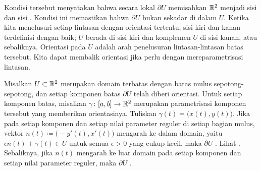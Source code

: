 Kondisi tersebut menyatakan bahwa secara lokal $\partial U$ memisahkan ${\mathbb{R}}^2$
menjadi sisi  dan sisi .  Kondisi ini memastikan
bahwa $\partial U$ bukan sekadar  di dalam $U$.
Ketika kita menelusuri setiap lintasan dengan
orientasi tertentu, sisi kiri dan kanan terdefinisi dengan baik; $U$ berada di
sisi kiri dan komplemen $U$ di sisi kanan, atau sebaliknya.
Orientasi pada $U$ adalah arah penelusuran lintasan-lintasan batas tersebut.
Kita dapat membalik orientasi jika perlu dengan mereparametrisasi lintasan.

\begin{defn}
Misalkan $U \subset {\mathbb{R}}^2$ merupakan domain terbatas dengan batas mulus
sepotong-sepotong, dan setiap komponen batas $\partial U$ telah diberi orientasi.
Untuk setiap komponen batas, misalkan $\gamma \colon [a,b] \to {\mathbb{R}}^2$
merupakan parametrisasi komponen tersebut yang memberikan orientasinya.
Tuliskan $\gamma(t) = \big(x(t),y(t)\bigr)$.  Jika pada setiap komponen dan
setiap nilai parameter reguler di setiap bagian mulus, vektor
$n(t) \coloneqq \bigl(-y'(t),x'(t)\bigr)$ mengarah ke dalam domain,
yaitu $\epsilon n(t) + \gamma(t) \in U$ untuk semua $\epsilon > 0$ yang cukup
kecil, maka $\partial U$ \emph{}.
Lihat .
Sebaliknya, jika $n(t)$ mengarah ke luar domain pada setiap komponen dan setiap
nilai parameter reguler, maka $\partial U$
\emph{}.
\end{defn}

\begin{myfigureht}
\caption{Domain berorientasi positif (kiri) dan domain berlubang yang
berorientasi positif (kanan).\label{fig:positiveorient}}
\end{myfigureht}


